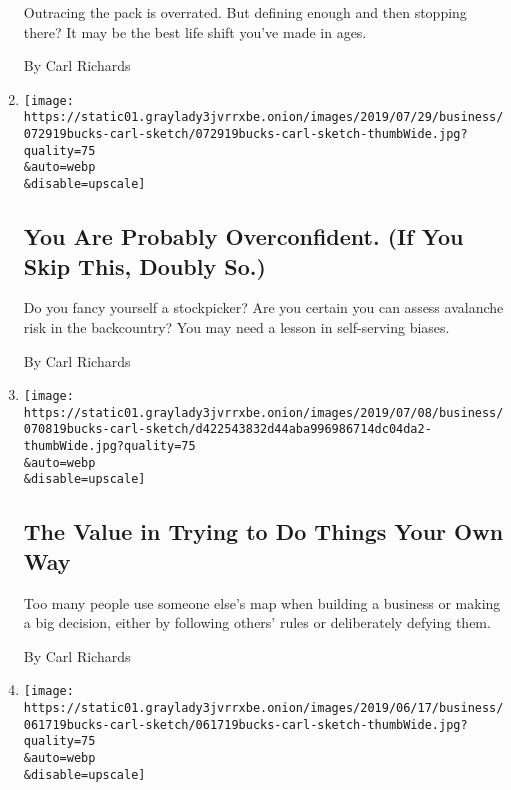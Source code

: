 \begin{enumerate}
  Outracing the pack is overrated. But defining enough and then stopping
  there? It may be the best life shift you've made in ages.

  By Carl Richards
\item
  \href{/2019/07/29/business/confidence-bias-investing.html}{}

  \texttt{[image: https://static01.graylady3jvrrxbe.onion/images/2019/07/29/business/072919bucks-carl-sketch/072919bucks-carl-sketch-thumbWide.jpg?quality=75\\\&auto=webp\\\&disable=upscale]}

  \hypertarget{you-are-probably-overconfident-if-you-skip-this-doubly-so}{%
  \subsection{You Are Probably Overconfident. (If You Skip This, Doubly
  So.)}\label{you-are-probably-overconfident-if-you-skip-this-doubly-so}}

  Do you fancy yourself a stockpicker? Are you certain you can assess
  avalanche risk in the backcountry? You may need a lesson in
  self-serving biases.

  By Carl Richards
\item
  \href{/2019/07/08/your-money/sketch-guy-your-own-way.html}{}

  \texttt{[image: https://static01.graylady3jvrrxbe.onion/images/2019/07/08/business/070819bucks-carl-sketch/d422543832d44aba996986714dc04da2-thumbWide.jpg?quality=75\\\&auto=webp\\\&disable=upscale]}

  \hypertarget{the-value-in-trying-to-do-things-your-own-way}{%
  \subsection{The Value in Trying to Do Things Your Own
  Way}\label{the-value-in-trying-to-do-things-your-own-way}}

  Too many people use someone else's map when building a business or
  making a big decision, either by following others' rules or
  deliberately defying them.

  By Carl Richards
\item
  \href{/2019/06/17/business/the-true-price-of-the-thing-youre-buying-may-not-be-printed-on-it.html}{}

  \texttt{[image: https://static01.graylady3jvrrxbe.onion/images/2019/06/17/business/061719bucks-carl-sketch/061719bucks-carl-sketch-thumbWide.jpg?quality=75\\\&auto=webp\\\&disable=upscale]}


\end{enumerate}
